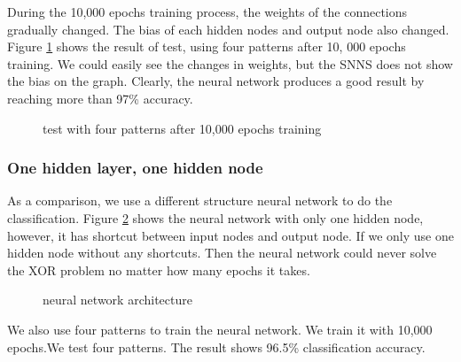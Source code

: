 \documentclass[11pt, a4paper, oneside, openright]{article}
\begin{document}
During the 10,000 epochs training process, the weights of the connections gradually changed. The bias of each hidden nodes and output node also changed. Figure \ref{fig:aftertrain} shows the result of test, using four patterns after 10, 000 epochs training. We could easily see the changes in weights, but the SNNS does not show the bias on the graph. Clearly, the neural network produces a good result by reaching more than 97\% accuracy.

  \begin{figure}[!ht]
  \centerline{}
  \caption{test with four patterns after 10,000 epochs training}
  \label{fig:aftertrain}
  \end{figure}

\subsubsection{One hidden layer, one hidden node}
As a comparison, we use a different structure neural network to do the classification. Figure \ref{fig:neural_2} shows the  neural network with only one hidden node, however, it has shortcut between input nodes and output node. If we only use one hidden node without any shortcuts. Then the neural network could never solve the XOR problem no matter how many epochs it takes.
  \begin{figure}[!ht]
  \centerline{}
  \caption{neural network architecture}
  \label{fig:neural_2}
  \end{figure}
\newline We also use four patterns to train the neural network. We train it with 10,000 epochs.We test four patterns. The result shows 96.5\% classification accuracy.
\end{document}

